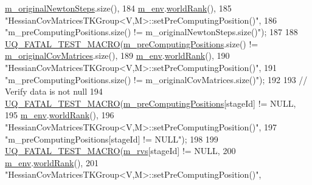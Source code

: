 \begin{DoxyCode}
      \hyperlink{class_q_u_e_s_o_1_1_hessian_cov_matrices_t_k_group_a4c0fe3171a35cdd453a4e23e1438ddf9}{m\_originalNewtonSteps}.size(),
184                       \hyperlink{class_q_u_e_s_o_1_1_base_t_k_group_a2bce5e8aa5c844d4332a0e73cf00a1f9}{m\_env}.\hyperlink{class_q_u_e_s_o_1_1_base_environment_a78b57112bbd0e6dd0e8afec00b40ffa7}{worldRank}(),
185                       \textcolor{stringliteral}{"HessianCovMatricesTKGroup<V,M>::setPreComputingPosition()"},
186                       \textcolor{stringliteral}{"m\_preComputingPositions.size() != m\_originalNewtonSteps.size()"});
187 
188   \hyperlink{_defines_8h_a56d63d18d0a6d45757de47fcc06f574d}{UQ\_FATAL\_TEST\_MACRO}(\hyperlink{class_q_u_e_s_o_1_1_base_t_k_group_a93d7fe55e30a7c6f209b01cb8a67e322}{m\_preComputingPositions}.size() != 
      \hyperlink{class_q_u_e_s_o_1_1_hessian_cov_matrices_t_k_group_acc7219917faf933e77694894856fa646}{m\_originalCovMatrices}.size(),
189                       \hyperlink{class_q_u_e_s_o_1_1_base_t_k_group_a2bce5e8aa5c844d4332a0e73cf00a1f9}{m\_env}.\hyperlink{class_q_u_e_s_o_1_1_base_environment_a78b57112bbd0e6dd0e8afec00b40ffa7}{worldRank}(),
190                       \textcolor{stringliteral}{"HessianCovMatricesTKGroup<V,M>::setPreComputingPosition()"},
191                       \textcolor{stringliteral}{"m\_preComputingPositions.size() != m\_originalCovMatrices.size()"});
192 
193   \textcolor{comment}{// Verify data is not null}
194   \hyperlink{_defines_8h_a56d63d18d0a6d45757de47fcc06f574d}{UQ\_FATAL\_TEST\_MACRO}(\hyperlink{class_q_u_e_s_o_1_1_base_t_k_group_a93d7fe55e30a7c6f209b01cb8a67e322}{m\_preComputingPositions}[stageId] != NULL,
195                       \hyperlink{class_q_u_e_s_o_1_1_base_t_k_group_a2bce5e8aa5c844d4332a0e73cf00a1f9}{m\_env}.\hyperlink{class_q_u_e_s_o_1_1_base_environment_a78b57112bbd0e6dd0e8afec00b40ffa7}{worldRank}(),
196                       \textcolor{stringliteral}{"HessianCovMatricesTKGroup<V,M>::setPreComputingPosition()"},
197                       \textcolor{stringliteral}{"m\_preComputingPositions[stageId] != NULL"});
198 
199   \hyperlink{_defines_8h_a56d63d18d0a6d45757de47fcc06f574d}{UQ\_FATAL\_TEST\_MACRO}(\hyperlink{class_q_u_e_s_o_1_1_base_t_k_group_a87c6b02ea45ab3de634c22afa58f53a5}{m\_rvs}[stageId] != NULL,
200                       \hyperlink{class_q_u_e_s_o_1_1_base_t_k_group_a2bce5e8aa5c844d4332a0e73cf00a1f9}{m\_env}.\hyperlink{class_q_u_e_s_o_1_1_base_environment_a78b57112bbd0e6dd0e8afec00b40ffa7}{worldRank}(),
201                       \textcolor{stringliteral}{"HessianCovMatricesTKGroup<V,M>::setPreComputingPosition()"},

\end{DoxyCode}
